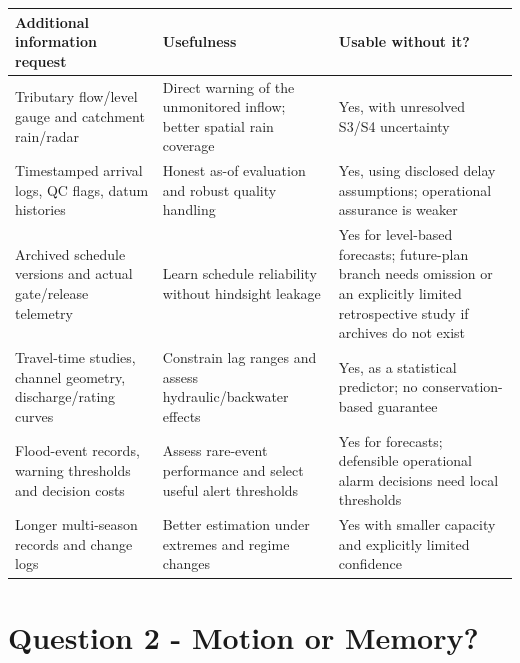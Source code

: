 \documentclass[
  10pt,
  a4paper,
]{article}
\newcounter{none} %
\begin{document}
{\def\LTcaptype{none} %
\begin{longtable}[]{@{}
  >{\raggedright\arraybackslash}p{}
  >{\raggedright\arraybackslash}p{}
  >{\raggedright\arraybackslash}p{}@{}}
\toprule\noalign{}
\begin{minipage}[b]{\linewidth}\raggedright
Additional information request
\end{minipage} & \begin{minipage}[b]{\linewidth}\raggedright
Usefulness
\end{minipage} & \begin{minipage}[b]{\linewidth}\raggedright
Usable without it?
\end{minipage} \\
\midrule\noalign{}
\endhead
\bottomrule\noalign{}
\endlastfoot
Tributary flow/level gauge and catchment rain/radar & Direct warning of
the unmonitored inflow; better spatial rain coverage & Yes, with
unresolved S3/S4 uncertainty \\
Timestamped arrival logs, QC flags, datum histories & Honest as-of
evaluation and robust quality handling & Yes, using disclosed delay
assumptions; operational assurance is weaker \\
Archived schedule versions and actual gate/release telemetry & Learn
schedule reliability without hindsight leakage & Yes for level-based
forecasts; future-plan branch needs omission or an explicitly limited
retrospective study if archives do not exist \\
Travel-time studies, channel geometry, discharge/rating curves &
Constrain lag ranges and assess hydraulic/backwater effects & Yes, as a
statistical predictor; no conservation-based guarantee \\
Flood-event records, warning thresholds and decision costs & Assess
rare-event performance and select useful alert thresholds & Yes for
forecasts; defensible operational alarm decisions need local
thresholds \\
Longer multi-season records and change logs & Better estimation under
extremes and regime changes & Yes with smaller capacity and explicitly
limited confidence \\
\end{longtable}
}

\newpage

\section{Question 2 - Motion or
Memory?}\label{question-2---motion-or-memory}
\end{document}
